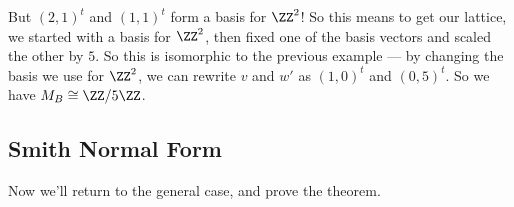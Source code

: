 But $(2, 1)^t$ and $(1, 1)^t$ form a basis for $\ZZ^2$! So this means to get our lattice, we started with a basis for $\ZZ^2$, then fixed one of the basis vectors and scaled the other by $5$. So this is isomorphic to the previous example --- by changing the basis we use for $\ZZ^2$, we can rewrite $v$ and $w'$ as $(1, 0)^t$ and $(0, 5)^t$. So we have $M_B \cong \ZZ/5\ZZ$. 




\subsection{Smith Normal Form}

Now we'll return to the general case, and prove the theorem. 

